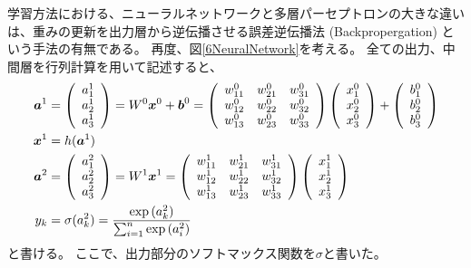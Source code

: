 学習方法における、ニューラルネットワークと多層パーセプトロンの大きな違いは、重みの更新を出力層から逆伝播させる誤差逆伝播法 (Backpropergation\cite{Backpropagation}) という手法の有無である。
再度、図\ref{6NeuralNetwork}を考える。
全ての出力、中間層を行列計算を用いて記述すると、
\begin{equation}
 \begin{split}
  {\mbox{\boldmath{$a$}}}^1&=
  \left(
    \begin{array}{ccc}
      a^1_1 \\
      a^1_2 \\
      a^1_3 
    \end{array}
  \right)
  =
  W^0{\mbox{\boldmath{$x$}}}^0 + {\mbox{\boldmath{$b$}}}^0
  =
  \left(
    \begin{array}{ccc}
      w^0_{11} & w^0_{21} & w^0_{31} \\
      w^0_{12} & w^0_{22} & w^0_{32} \\
      w^0_{13} & w^0_{23} & w^0_{33}
    \end{array}
  \right)
  \left(
    \begin{array}{ccc}
      x^0_1 \\
      x^0_2 \\
      x^0_3
    \end{array}
  \right)
  +
  \left(
    \begin{array}{ccc}
      b^0_1 \\
      b^0_2 \\
      b^0_3
    \end{array}
  \right)\\
  {\mbox{\boldmath{$x$}}}^1&=h({\mbox{\boldmath{$a$}}}^1)\\
  {\mbox{\boldmath{$a$}}}^2&=
  \left(
    \begin{array}{ccc}
      a^2_1 \\
      a^2_2 \\
      a^2_3 
    \end{array}
  \right)
  =
  W^1{\mbox{\boldmath{$x$}}}^1
  =
  \left(
    \begin{array}{ccc}
      w^1_{11} & w^1_{21} & w^1_{31} \\
      w^1_{12} & w^1_{22} & w^1_{32} \\
      w^1_{13} & w^1_{23} & w^1_{33}
    \end{array}
  \right)
  \left(
    \begin{array}{ccc}
      x^1_1 \\
      x^1_2 \\
      x^1_3
    \end{array}
  \right)\\
 y_k &= \sigma(a^2_k) = \frac{\exp{(a^2_k)}}{\sum^n_{i=1}\exp{(a^2_i)}}
 \end{split}
\end{equation}
と書ける。
ここで、出力部分のソフトマックス関数を$\sigma$と書いた。

